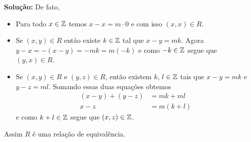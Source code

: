 \documentclass[12pt]{article}
\begin{document}
\noindent\textbf{Solu\c{c}\~ao:} De fato,
	\begin{itemize}
		\item Para todo $x\in \mathbb{Z}$ temos $x - x = m\cdot0$ e com isso $(x,x) \in R$.
		\item Se $(x,y) \in R$ então existe $k \in \mathbb{Z}$ tal que $x - y = mk$. Agora $y - x = -(x - y) = -mk = m (-k)$ e como $-k \in \mathbb{Z}$ segue que $(y,x) \in R$.
		\item Se $(x,y) \in R$ e $(y,z) \in R$, então existem $k$, $l\in \mathbb{Z}$ tais que $x - y = mk$ e $y - z = ml$.
		Somando essas duas equações obtemos
		\begin{align*}
			(x - y) + (y - z) &= mk + ml\\
			x - z &= m(k + l)
		\end{align*}
		e como $k + l \in \mathbb{Z}$ segue que $(x,z) \in \mathbb{Z}$.
	\end{itemize}
	
	Assim $R$ é uma relação de equivalência.
\end{document}
